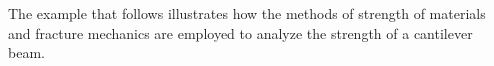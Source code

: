 \documentclass{AeroStructure-ERJohnson}
\begin{document}

The example that follows illustrates how the methods of strength of materials and fracture mechanics are employed to analyze the strength of a cantilever beam.
\end{document}
